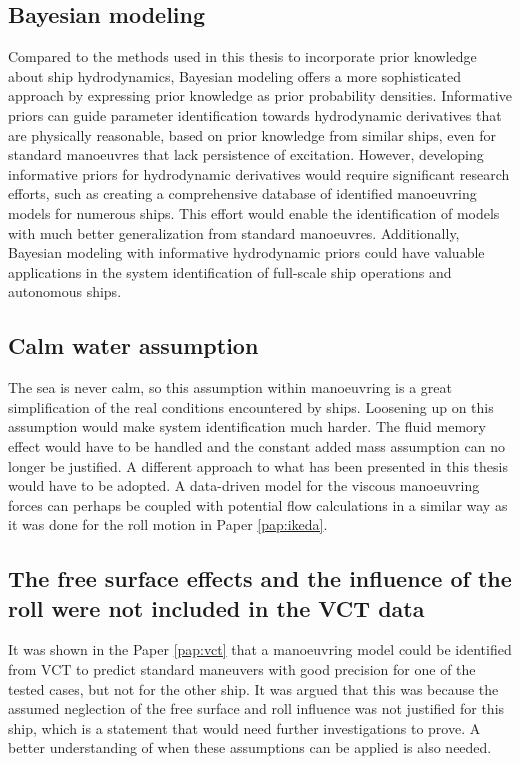 \subsection*{Bayesian modeling}
Compared to the methods used in this thesis to incorporate prior knowledge about ship hydrodynamics, Bayesian modeling offers a more sophisticated approach by expressing prior knowledge as prior probability densities. Informative priors can guide parameter identification towards hydrodynamic derivatives that are physically reasonable, based on prior knowledge from similar ships, even for standard manoeuvres that lack persistence of excitation. However, developing informative priors for hydrodynamic derivatives would require significant research efforts, such as creating a comprehensive database of identified manoeuvring models for numerous ships. This effort would enable the identification of models with much better generalization from standard manoeuvres. Additionally, Bayesian modeling with informative hydrodynamic priors could have valuable applications in the system identification of full-scale ship operations and autonomous ships. 

\subsection*{Calm water assumption}
The sea is never calm, so this assumption within manoeuvring is a great simplification of the real conditions encountered by ships. Loosening up on this assumption would make system identification much harder. The fluid memory effect would have to be handled and the constant added mass assumption can no longer be justified. A different approach to what has been presented in this thesis would have to be adopted. A data-driven model for the viscous manoeuvring forces can perhaps be coupled with potential flow calculations in a similar way as it was done for the roll motion in Paper \ref{pap:ikeda}.  
    
\subsection*{The free surface effects and the influence of the roll were not included in the VCT data}
It was shown in the Paper \ref{pap:vct} that a manoeuvring model could be identified from VCT to predict standard maneuvers with good precision for one of the tested cases, but not for the other ship. 
It was argued that this was because the assumed neglection of the free surface and roll influence was not justified for this ship, which is a statement that would need further investigations to prove. A better understanding of when these assumptions can be applied is also needed.   
        
